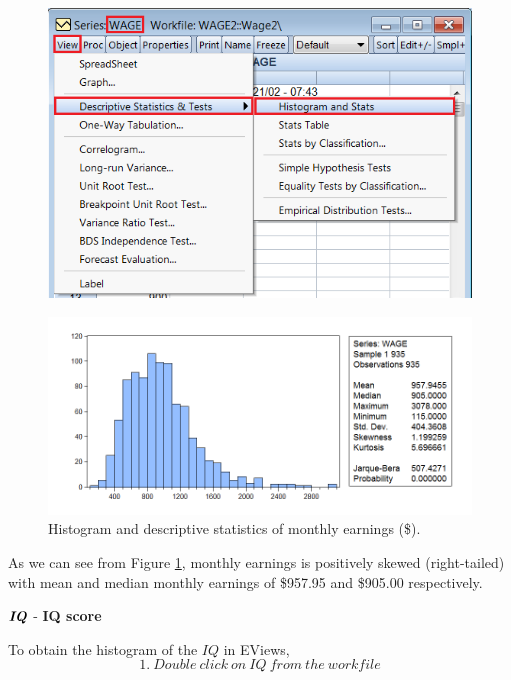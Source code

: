 \documentclass[12pt]{report}
\begin{document}
\begin{figure}[H]
\centering
\includegraphics{q3_2}
\end{figure}
\vspace{-\baselineskip}
\begin{figure}[H]
\centerline{\includegraphics{q3_3}}
\caption{Histogram and descriptive statistics of monthly earnings (\$).}
\label{fig:hist1}
\end{figure}
\vspace{-\baselineskip}
\noindent As we can see from Figure \ref{fig:hist1}, monthly earnings is positively skewed (right-tailed) with mean and median monthly earnings of \$957.95 and \$905.00 respectively. \par
\begin{center}
$\textbf{\textit{IQ}}$ - \textbf{IQ score}
\end{center}
\noindent To obtain the histogram of the $IQ$ in EViews,
$$1.\ Double\ click\ on\ IQ\ from\ the\ workfile$$
\end{document}
